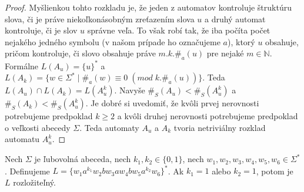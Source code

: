 \begin{proof}
Myšlienkou tohto rozkladu je, že jeden z automatov kontroluje štruktúru slova, či je práve niekoľkonásobným zreťazením slova $ u $ a druhý automat kontroluje, či je slov $ u $ správne veľa. To však robí tak, že iba počíta počet nejakého jedného symbolu (v našom prípade ho označujeme $ a $), ktorý $ u $ obsahuje, pričom kontroluje, či slovo obsahuje práve $ m.k.\#_a(u) $ pre nejaké $ m \in \mathbb{N} $. Formálne $ L(A_u) = \lbrace u \rbrace^* $ a $ L(A_k) = \lbrace w \in \Sigma^* \; | \; \#_a(w) \equiv 0 \; (mod \; k.\#_a(u)) \rbrace $. Teda $ L(A_u) \cap L(A_k) = L(A_u^k) $. Navyše $ \#_S(A_u) < \#_S(A_u^k) $ a $ \#_S(A_k) < \#_S(A_u^k) $. Je dobré si uvedomiť, že kvôli prvej nerovnosti potrebujeme predpoklad $ k \geq 2 $ a kvôli druhej nerovnosti potrebujeme predpoklad o veľkosti abecedy $ \Sigma $. Teda automaty $ A_u $ a $ A_k $ tvoria netriviálny rozklad automatu $ A_u^k $.

\end{proof}

\begin{theorem}
Nech $ \Sigma $ je ľubovolná abeceda, nech $ k_1,k_2 \in \lbrace 0,1 \rbrace $, nech $ w_1,w_2,w_3,w_4,w_5,w_6 \in \Sigma^* $. Definujeme $ L = \lbrace w_1a^{k_1}w_2bw_3aw_4bw_5a^{k_2}w_6 \rbrace^* $. Ak $ k_1 = 1 $ alebo $ k_2 = 1 $, potom je $ L $ rozložiteľný.
\end{theorem}

